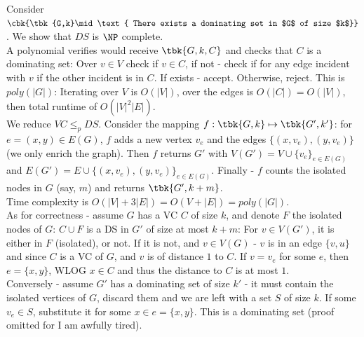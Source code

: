 \begin{example}
	Consider $\cbk{\tbk{G,k}\mid \text{ There exists a dominating set in $G$ of size $k$}}$. We show that $DS$ is $\NP$ complete.\\
	A polynomial verifies would receive $\tbk{G,k,C}$ and checks that $C$ is a dominating set: Over $v\in V$ check if $v\in C$, if not - check if for any edge incident with $v$ if the other incident is in $C$. If exists - accept. Otherwise, reject. This is $poly(|G|)$: Iterating over $V$ is $O(|V|)$, over the edges is $O(|C|) = O(|V|)$, then total runtime of $O(|V|^2|E|)$.\\
	We reduce $VC\leq_p DS$. Consider the mapping $f: \tbk{G,k}\mapsto \tbk{G',k'}$: for $e = (x,y)\in E(G)$, $f$ adds a new vertex $v_e$ and the edges $\{(x,v_e), (y,v_e)\}$ (we only enrich the graph). Then $f$ returns $G'$ with $V(G') = V\cup \{v_e\}_{e\in E(G)}$ and $E(G') = E\cup \{(x,v_e), (y,v_e)\}_{e\in E(G)}$. Finally - $f$ counts the isolated nodes in $G$ (say, $m$) and returns $\tbk{G', k + m}$.\\
	Time complexity is $O(|V| + 3|E|) = O(V + |E|) = poly(|G|)$.\\
	As for correctness - assume $G$ has a VC $C$ of size $k$, and denote $F$ the isolated nodes of $G$: $C\cup F$ is a DS in $G'$ of size at most $k + m$: For $v\in V(G')$, it is either in $F$ (isolated), or not. If it is not, and $v\in V(G)$ - $v$ is in an edge $\{v,u\}$ and since $C$ is a VC of $G$, and $v$ is of distance $1$ to $C$. If $v = v_e$ for some $e$, then $e = \{x,y\}$, WLOG $x\in C$ and thus the distance to $C$ is at most $1$.\\
	
	Conversely - assume $G'$ has a dominating set of size $k'$ - it must contain the isolated vertices of $G$, discard them and we are left with a set $S$ of size $k$. If some $v_e\in S$, substitute it for some $x\in e = \{x,y\}$. This is a dominating set (proof omitted for I am awfully tired).
 \end{example}
